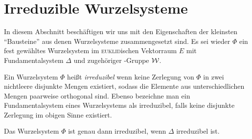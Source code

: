 \section{Irreduzible Wurzelsysteme}
\label{sec:irreduc}

In diesem Abschnitt beschäftigen wir uns mit den Eigenschaften der kleinsten ``Bausteine'' aus denen Wurzelsysteme zusammengesetzt sind.
Es sei wieder $\Phi$ ein fest gewähltes Wurzelsystem im \textsc{euklid}ischen Vektorraum $E$ mit Fundamentalsystem $\Delta$ und zugehöriger \weyl\hyp{}Gruppe $\mathcal{W}$.

\begin{defn}
  Ein Wurzelsystem $\Phi$ heißt \emph{irreduzibel} wenn keine Zerlegung von $\Phi$ in zwei nichtleere disjunkte Mengen existiert, sodass die Elemente aus unterschiedlichen Mengen paarweise orthogonal sind.
  Ebenso bezeichne man ein Fundamentalsystem eines Wurzelsystems als irreduzibel, falls keine disjunkte Zerlegung im obigen Sinne existiert.
\end{defn}

\begin{lem}
  \label{lem:irreducibleRoot}
  Das Wurzelsystem $\Phi$ ist genau dann irreduzibel, wenn $\Delta$ irreduzibel ist.
\end{lem}

